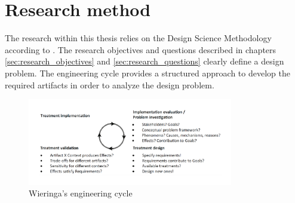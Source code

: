 \section{Research method} \label{sec:research_method}

The research within this thesis relies on the Design Science Methodology according to
\citeauthor*{wieringa_design_2014-1}. The research objectives and questions described in
chapters \ref{sec:research_objectives} and \ref*{sec:research_questions} clearly define a
design problem. The engineering cycle provides a structured approach to develop the
required artifacts in order to analyze the design problem.

\begin{figure}[H]
    \centering
    \includegraphics[width=0.8\textwidth]{Figures/engineering_cycle.pdf}
    \caption[Engineering cycle]{Wieringa's engineering cycle}
    \label{fig:engineering_cycle}
\end{figure}